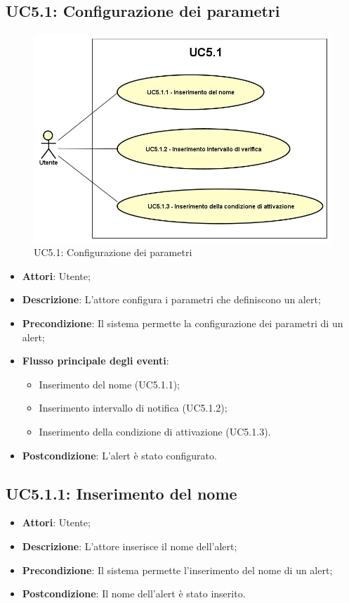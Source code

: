 \subsection{UC5.1: Configurazione dei parametri}
\hypertarget{UC5.1}{}
\begin{figure} [H]
	\centering
	\includegraphics[scale=0.45]{Img/UC5-1}
	\caption{UC5.1: Configurazione dei parametri}\label{}
\end{figure}
\begin{itemize}
	\item \textbf{Attori}: Utente;
	\item \textbf{Descrizione}: L'attore configura i parametri che definiscono un alert;
	\item \textbf{Precondizione}: Il sistema permette la configurazione dei parametri di un alert;
	\item \textbf{Flusso principale degli eventi}:
		\begin{itemize}
			\item Inserimento del nome (UC5.1.1);
			\item Inserimento intervallo di notifica (UC5.1.2);
			\item Inserimento della condizione di attivazione (UC5.1.3).
		\end{itemize}
	\item \textbf{Postcondizione}: L'alert è stato configurato.
\end{itemize}

\subsection{UC5.1.1: Inserimento del nome}
\hypertarget{UC5.1.1}{}
\begin{itemize}
	\item \textbf{Attori}: Utente;
	\item \textbf{Descrizione}: L'attore inserisce il nome dell'alert;
	\item \textbf{Precondizione}: Il sistema permette l'inserimento del nome di un alert;
	\item \textbf{Postcondizione}: Il nome dell'alert è stato inserito.
\end{itemize}

